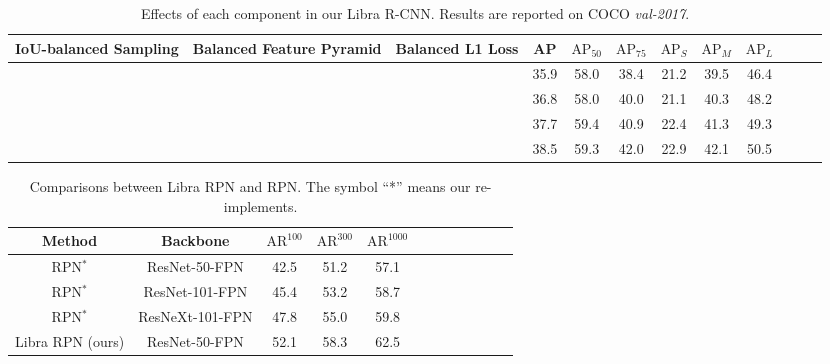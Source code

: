 \documentclass[10pt,twocolumn,letterpaper]{article}
\begin{document}
\begin{table*}[htb]
	\centering
	\caption{Effects of each component in our Libra R-CNN. Results are reported on COCO \emph{val-2017}.}
	\vspace{0.1cm}
	\addtolength{\tabcolsep}{0pt}
	\begin{tabular}{*{12}{c}}
		\toprule
		IoU-balanced Sampling & Balanced Feature Pyramid & Balanced L1 Loss & AP   & $\text{AP}_{50}$ & $\text{AP}_{75}$ & $\text{AP}_{S}$ & $\text{AP}_{M}$ & $\text{AP}_{L}$ \\
		\midrule
		                      &                          &                  & 35.9 & 58.0             & 38.4             & 21.2            & 39.5            & 46.4            \\
		\checkmark            &                          &                  & 36.8 & 58.0             & 40.0             & 21.1            & 40.3            & 48.2            \\
		\checkmark            & \checkmark               &                  & 37.7 & 59.4             & 40.9             & 22.4            & 41.3            & 49.3            \\
		\checkmark            & \checkmark               & \checkmark       & 38.5 & 59.3             & 42.0             & 22.9            & 42.1            & 50.5            \\
		\bottomrule
	\end{tabular}
	\label{tab:overall-ablation}
\end{table*}


\begin{table}[htb]
	\centering
	\caption{Comparisons between Libra RPN and RPN. The symbol ``*'' means our re-implements.}
	\vspace{-2pt}
	\addtolength{\tabcolsep}{-5pt}
	\begin{tabular}{*{12}{c}}
		\toprule
		Method           & Backbone        & $\text{AR}^{100}$ & $\text{AR}^{300}$ & $\text{AR}^{1000}$ \\
		\midrule
		RPN$^*$          & ResNet-50-FPN   & 42.5              & 51.2              & 57.1               \\
		RPN$^*$          & ResNet-101-FPN  & 45.4              & 53.2              & 58.7               \\
		RPN$^*$          & ResNeXt-101-FPN & 47.8              & 55.0              & 59.8               \\
		\midrule
		Libra RPN (ours) & ResNet-50-FPN   & 52.1              & 58.3              & 62.5               \\
		\bottomrule
	\end{tabular}
	\label{tab:rpn}
\end{table}
\end{document}
